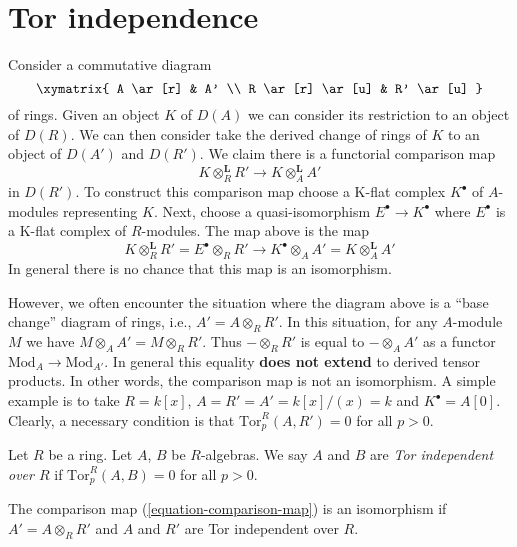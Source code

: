 \section{Tor independence}
\label{section-tor-independence}

\noindent
Consider a commutative diagram
$$
\xymatrix{
A \ar[r] & A' \\
R \ar[r] \ar[u] & R' \ar[u]
}
$$
of rings. Given an object $K$ of $D(A)$ we can consider its restriction
to an object of $D(R)$. We can then consider take the derived change of
rings of $K$ to an object of $D(A')$ and $D(R')$.
We claim there is a functorial comparison map
\begin{equation}
\label{equation-comparison-map}
K \otimes_R^{\mathbf{L}} R' \longrightarrow
K \otimes_A^{\mathbf{L}} A'
\end{equation}
in $D(R')$. To construct this comparison map choose a K-flat
complex $K^\bullet$ of $A$-modules representing $K$. Next, choose
a quasi-isomorphism $E^\bullet \to K^\bullet$ where $E^\bullet$
is a K-flat complex of $R$-modules. The map above is the map
$$
K \otimes_R^{\mathbf{L}} R' =
E^\bullet \otimes_R R'
\longrightarrow
K^\bullet \otimes_A A' =
K \otimes_A^{\mathbf{L}} A'
$$
In general there is no chance that this map is an isomorphism.

\medskip\noindent
However, we often encounter the situation where the diagram above
is a ``base change'' diagram of rings, i.e., $A' = A \otimes_R R'$.
In this situation, for any $A$-module $M$ we have
$M \otimes_A A' = M \otimes_R R'$. Thus $- \otimes_R R'$
is equal to $- \otimes_A A'$ as a functor $\text{Mod}_A \to \text{Mod}_{A'}$.
In general this equality {\bf does not extend} to derived tensor products.
In other words, the comparison map is not an isomorphism.
A simple example is to take
$R = k[x]$, $A = R' = A' = k[x]/(x) = k$ and $K^\bullet = A[0]$.
Clearly, a necessary condition is that $\text{Tor}_p^R(A, R') = 0$
for all $p > 0$.

\begin{definition}
\label{definition-tor-independent}
Let $R$ be a ring. Let $A$, $B$ be $R$-algebras. We say
$A$ and $B$ are {\it Tor independent over $R$} if
$\text{Tor}_p^R(A, B) = 0$ for all $p > 0$.
\end{definition}

\begin{lemma}
\label{lemma-base-change-comparison}
The comparison map (\ref{equation-comparison-map}) is an isomorphism
if $A' = A \otimes_R R'$ and $A$ and $R'$ are Tor independent over $R$.
\end{lemma}


